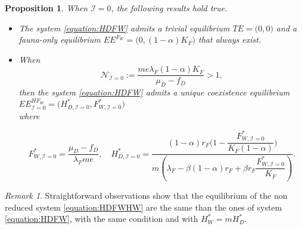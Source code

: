 \documentclass{article}
\newcommand{\lfw}{\lambda_{F}}
\newcommand{\lfw}{\lambda_{F}}
\newcommand{\cI}{\mathcal{I}}
\newtheorem{prop}[theorem]{Proposition}
\theoremstyle{definition}
\theoremstyle{remark}
\newtheorem{remark}[theorem]{Remark}
\begin{document}
\begin{prop}
\label{prop:equilibre, cI=0}
When $\cI = 0$, the following results hold true.
\begin{itemize}
\item The system \eqref{equation:HDFW} admits a trivial equilibrium $TE = \Big(0,0\Big)$ and a fauna-only equilibrium $EE^{F_W} = \Big(0, (1-\alpha)K_F \Big)$ that always exist.

\item When
$$
\mathcal{N}_{\cI = 0} := \dfrac{m e \lfw (1-\alpha)K_F}{\mu_D - f_D} >1,
$$ 
then the system \eqref{equation:HDFW} admits a unique coexistence equilibrium $EE^{HF_W}_{\cI = 0} = \Big(H^*_{D, \cI = 0}, F^*_{W, \cI = 0}\Big)$ \\ 
where 


$$F^*_{W, \cI = 0} = \dfrac{\mu_D - f_D}{\lfw m e},
\quad 
H^*_{D, \cI = 0} = \dfrac{(1-\alpha)r_F\Big(1 - \dfrac{F^*_{W, \cI = 0}}{K_F(1-\alpha)} \Big)}{m\left(\lfw - \beta (1-\alpha) r_F + \beta r_F  \dfrac{F^*_{W, \cI = 0}}{K_F}\right)}.
$$
\end{itemize}
\end{prop}

\begin{remark}\label{remark:existence1}
Straightforward observations show that the equilibrium of the non reduced system \eqref{equation:HDFWHW} are the same than the ones of system \eqref{equation:HDFW}, with the same condition and with $H_W^* = m H_D^*$.
\end{remark}
\end{document}
